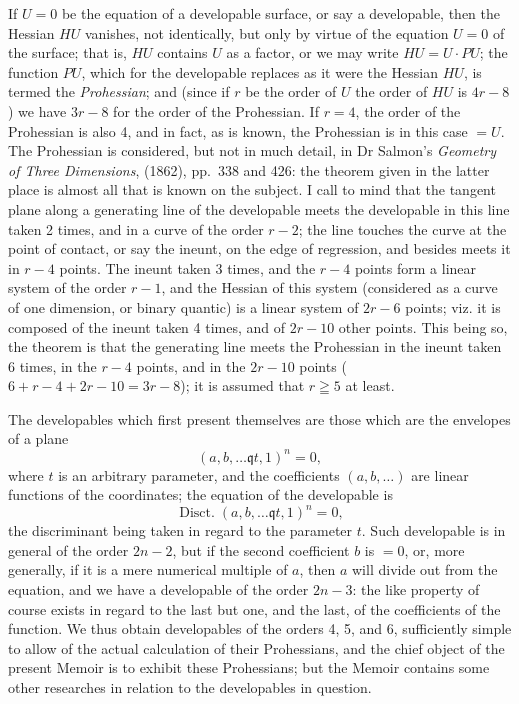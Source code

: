 \documentclass[11pt,a4paper]{article}
\theoremstyle{definition}
\DeclareMathOperator{\Disct}{Disct.}
\begin{document}
If $U = 0$ be the equation of a developable surface, or say a developable, then the
Hessian $HU$ vanishes, not identically, but only by virtue of the equation $U = 0$ of the
surface; that is, $HU$ contains $U$ as a factor, or we may write $HU = U \cdot PU$; the
function $PU$, which for the developable replaces as it were the Hessian $HU$, is termed
the \textit{Prohessian}; and (since if $r$ be the order of $U$ the order of $HU$ is $4r - 8$) we
have $3r - 8$ for the order of the Prohessian. If $r = 4$, the order of the Prohessian is
also 4, and in fact, as is known, the Prohessian is in this case $= U$. The Prohessian
is considered, but not in much detail, in Dr Salmon's \textit{Geometry of Three Dimensions},
(1862), pp.\ 338 and 426: the theorem given in the latter place is almost all that is
known on the subject. I call to mind that the tangent plane along a generating line
of the developable meets the developable in this line taken 2 times, and in a curve of
the order $r - 2$; the line touches the curve at the point of contact, or say the ineunt,
on the edge of regression, and besides meets it in $r - 4$ points. The ineunt taken
3 times, and the $r - 4$ points form a linear system of the order $r - 1$, and the Hessian
of this system (considered as a curve of one dimension, or binary quantic) is a linear
system of $2r - 6$ points; viz. it is composed of the ineunt taken 4 times, and of
$2r - 10$ other points. This being so, the theorem is that the generating line meets
the Prohessian in the ineunt taken 6 times, in the $r - 4$ points, and in the $2r - 10$
points ($6 + r - 4 + 2r - 10 = 3r - 8$); it is assumed that $r \geqq 5$ at least.

The developables which first present themselves are those which are the envelopes
of a plane
\[
(a, b, \dots \mathbin{\mathfrak{q}} t, 1)^n = 0,
\]
where $t$ is an arbitrary parameter, and the coefficients $(a, b, \dots)$ are linear functions
of the coordinates; the equation of the developable is
\[
\Disct(a, b, \dots \mathbin{\mathfrak{q}} t, 1)^n = 0,
\]
the discriminant being taken in regard to the parameter $t$. Such developable is in
general of the order $2n - 2$, but if the second coefficient $b$ is $=0$, or, more generally,
if it is a mere numerical multiple of $a$, then $a$ will divide out from the equation, and
we have a developable of the order $2n - 3$: the like property of course exists in regard
to the last but one, and the last, of the coefficients of the function. We thus obtain
developables of the orders 4, 5, and 6, sufficiently simple to allow of the actual
calculation of their Prohessians, and the chief object of the present Memoir is to
exhibit these Prohessians; but the Memoir contains some other researches in relation
to the developables in question.
\end{document}
